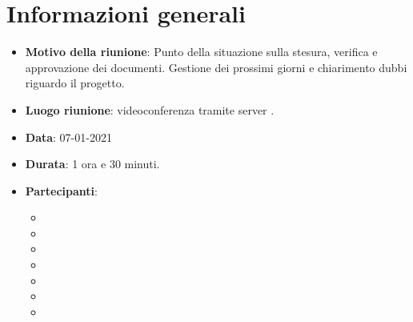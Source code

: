 \section{Informazioni generali}
\begin{itemize}
\item \textbf{Motivo della riunione}: Punto della situazione sulla stesura, verifica e approvazione dei documenti. Gestione dei prossimi giorni e chiarimento dubbi riguardo il progetto.
\item \textbf{Luogo riunione}: videoconferenza tramite server .
\item \textbf{Data}: 07-01-2021
\item \textbf{Durata}: 1 ora e 30 minuti.
\item \textbf{Partecipanti}:
	\begin{itemize}
	\item \BM{}
	\item \SG{}
	\item \SP{}
	\item \SH{}
	\item \PA{}
	\item \ZM{}
	\item \RA{}
	\end{itemize}
\end{itemize}

\newpage
